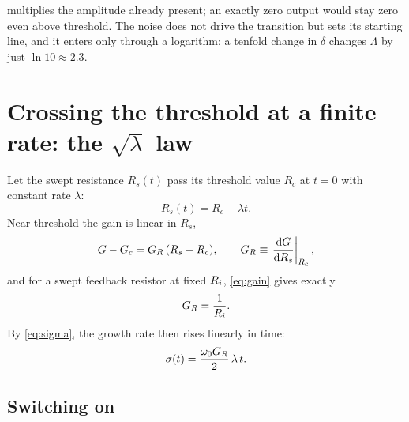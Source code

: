 \begin{whybox}
 multiplies the amplitude already present; an exactly zero output would stay zero even
above threshold. The noise does not drive the transition but sets its starting line, and it enters only
through a logarithm: a tenfold change in $\delta$ changes $\Lambda$ by just $\ln 10\approx 2.3$.
\end{whybox}

\section{Crossing the threshold at a finite rate: the \texorpdfstring{$\sqrt{\lambda}$}{square-root} law}
\label{sec:sqrt-law}

Let the swept resistance $R_{s}(t)$ pass its threshold value $R_{c}$ at $t=0$ with constant rate
$\lambda$:
\begin{equation}
  R_{s}(t) = R_{c} + \lambda t .
  \label{eq:ramp}
\end{equation}
Near threshold the gain is linear in $R_{s}$,
\begin{equation}
  G - G_{c} = G_{R}\,(R_{s}-R_{c}), \qquad G_{R} \equiv \left.\frac{\mathrm{d} G}{\mathrm{d} R_{s}}\right|_{R_{c}} ,
  \label{eq:GR}
\end{equation}
and for a swept feedback resistor at fixed $R_{i}$, \cref{eq:gain} gives exactly
\begin{equation}
  G_{R} = \frac{1}{R_{i}} .
  \label{eq:GR-RF}
\end{equation}
By \cref{eq:sigma}, the growth rate then rises linearly in time:
\begin{equation}
  \sigma(t) = \frac{\omega_{0} G_{R}}{2}\,\lambda\,t .
  \label{eq:sigma-ramp}
\end{equation}

\subsection{Switching on}

